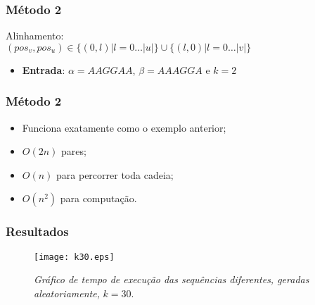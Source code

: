 \documentclass[10pt, compress]{beamer}
\newcommand{\aaa}{A}
\newcommand{\gga}{G}
\begin{document}
\begin{frame}[fragile]
	\frametitle{Método 2}
    
    \begin{center}
    	Alinhamento: \\
        
	    $(pos_v,pos_u) \in \{(0,l)|l=0 \ldots |u|\} \cup \{(l,0)|l=0 \ldots |v|\} $   
        \begin{itemize}
        	\centering
            \item \textbf{Entrada}: $\alpha = AAGGAA$, $\beta = AAAGGA$ e $k = 2$
        \end{itemize}        
        
    \end{center}
\end{frame}




\begin{frame}[fragile]
	\frametitle{Método 2}
    \begin{itemize}
    	\item Funciona exatamente como o exemplo anterior;
        \item $O(2n)$ pares;
        \item $O(n)$ para percorrer toda cadeia;
        \item $O(n^2)$ para computação.
    \end{itemize}    
\end{frame}

\begin{frame}[fragile]
	\frametitle{Resultados}
	\begin{figure}[!hbt]
		\centering
		\texttt{[image: k30.eps]}
		\caption{\textit{Gráfico de tempo de execução das sequências diferentes, geradas aleatoriamente, }$k = 30.$}
	\end{figure}
\end{frame}
\end{document}
